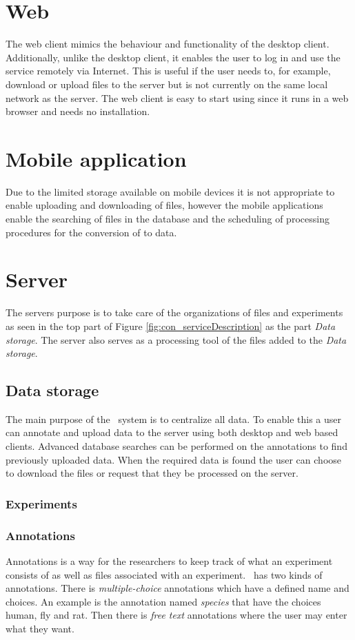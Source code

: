 \section{Web}
The web client mimics the behaviour and functionality of the desktop client. Additionally, unlike the desktop client, it enables the user to log in and use the service remotely via Internet. This is useful if the user needs to, for example, download or upload files to the server but is not currently on the same local network as the server. The web client is easy to start using since it runs in a web browser and needs no installation.


\section{Mobile application}
Due to the limited storage available on mobile devices it is not appropriate to enable uploading and downloading of files, however the mobile applications enable the searching of files in the database and the scheduling of processing procedures for the conversion of  to  data.

\section{Server}
The servers purpose is to take care of the organizations of files and experiments as seen in the top part of Figure \ref{fig:con_serviceDescription} as the part \textit{Data storage}. The server also serves as a processing tool of the files added to the \textit{Data storage}. 

\subsection{Data storage}
The main purpose of the \appName\ system is to centralize all data. To enable this a user can annotate and upload data to the server using both desktop and web based clients.
Advanced database searches can be performed on the annotations to find previously uploaded data. When the required data is found the user can choose to download the files or request that they be processed on the server.
\subsubsection{Experiments}


\subsubsection{Annotations}
Annotations is a way for the researchers to keep track of what an experiment consists of as well as files associated with an experiment.
\appName\ has two kinds of annotations. There is \textit{multiple-choice} annotations which have a defined name and choices. An example is the annotation named \textit{species} that have the choices human, fly and rat.
Then there is \textit{free text} annotations where the user may enter what they want.

